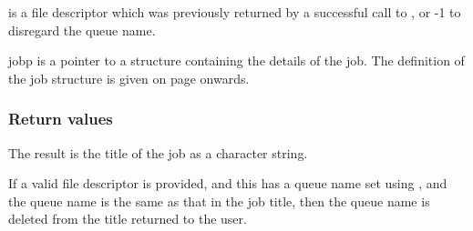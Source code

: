  is a file descriptor which was previously
returned by a successful call to \funcXBopen{}, or -1
to disregard the queue name.

jobp is a pointer to a structure containing the details of the job. The
definition of the job structure is given on page
\pageref{bkm:Jobstructure} onwards.

\subsubsection{Return values}
The result is the title of the job as a 
character string.

If a valid file descriptor is provided, and this has a queue name set
using \funcXBsetqueue{}, and the queue name is the
same as that in the job title, then the queue name is deleted from the
title returned to the user.

